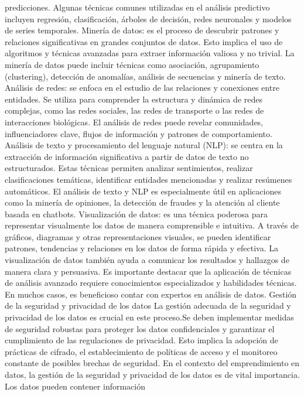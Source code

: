 \documentclass[
  letterpaper,
  DIV=11,
  numbers=noendperiod]{scrreprt}
\begin{document}
predicciones. Algunas técnicas comunes utilizadas en el análisis
predictivo incluyen regresión, clasificación, árboles de decisión, redes
neuronales y modelos de series temporales. Minería de datos: es el
proceso de descubrir patrones y relaciones significativas en grandes
conjuntos de datos. Esto implica el uso de algoritmos y técnicas
avanzadas para extraer información valiosa y no trivial. La minería de
datos puede incluir técnicas como asociación, agrupamiento (clustering),
detección de anomalías, análisis de secuencias y minería de texto.
Análisis de redes: se enfoca en el estudio de las relaciones y
conexiones entre entidades. Se utiliza para comprender la estructura y
dinámica de redes complejas, como las redes sociales, las redes de
transporte o las redes de interacciones biológicas. El análisis de redes
puede revelar comunidades, influenciadores clave, flujos de información
y patrones de comportamiento. Análisis de texto y procesamiento del
lenguaje natural (NLP): se centra en la extracción de información
significativa a partir de datos de texto no estructurados. Estas
técnicas permiten analizar sentimientos, realizar clasificaciones
temáticas, identificar entidades mencionadas y realizar resúmenes
automáticos. El análisis de texto y NLP es especialmente útil en
aplicaciones como la minería de opiniones, la detección de fraudes y la
atención al cliente basada en chatbots. Visualización de datos: es una
técnica poderosa para representar visualmente los datos de manera
comprensible e intuitiva. A través de gráficos, diagramas y otras
representaciones visuales, se pueden identificar patrones, tendencias y
relaciones en los datos de forma rápida y efectiva. La visualización de
datos también ayuda a comunicar los resultados y hallazgos de manera
clara y persuasiva. Es importante destacar que la aplicación de técnicas
de análisis avanzado requiere conocimientos especializados y habilidades
técnicas. En muchos casos, es beneficioso contar con expertos en
análisis de datos. Gestión de la seguridad y privacidad de los datos La
gestión adecuada de la seguridad y privacidad de los datos es crucial en
este proceso.Se deben implementar medidas de seguridad robustas para
proteger los datos confidenciales y garantizar el cumplimiento de las
regulaciones de privacidad. Esto implica la adopción de prácticas de
cifrado, el establecimiento de políticas de acceso y el monitoreo
constante de posibles brechas de seguridad. En el contexto del
emprendimiento en datos, la gestión de la seguridad y privacidad de los
datos es de vital importancia. Los datos pueden contener información
\end{document}
